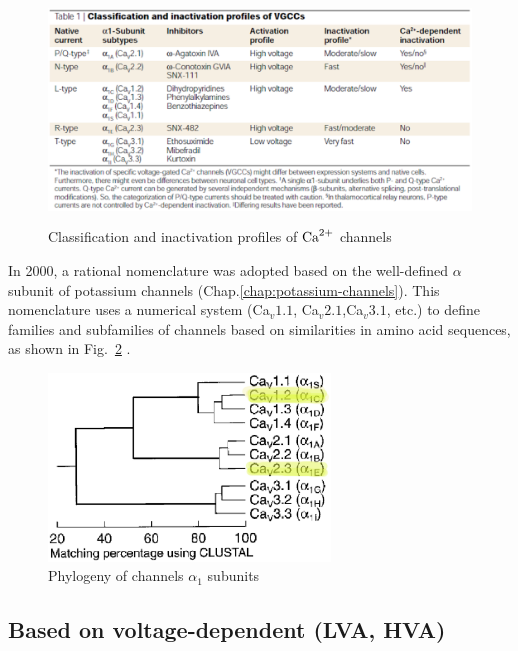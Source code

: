 \begin{figure}[hbt]
  \centerline{\includegraphics[height=6cm,
    angle=0]{./images/Ca_channel_info.eps}}
\caption{Classification and inactivation profiles of ${\text{Ca}^{2+}}$ channels}
\label{fig:Ca_channel_info}
\end{figure}


In 2000, a rational nomenclature was adopted based on the well-defined $\alpha$
subunit of potassium channels \citep{Ertel2000Nomenclature}
(Chap.\ref{chap:potassium-channels}). This nomenclature uses a
numerical system (Ca$_v1.1$, Ca$_v2.1$,Ca$_v3.1$, etc.) to define families and subfamilies of
 channels based on similarities in amino acid sequences,
as shown in Fig.~\ref{fig:ca_channel_phylogeny}
\citep{catterall2005iup}.

\begin{figure}[htb]
  \centerline{\includegraphics[height=5cm]{./images/Ca_channel_nomenclature.eps}}
  \caption{Phylogeny of  channels $\alpha_1$ subunits}
  \label{fig:ca_channel_phylogeny}
\end{figure}

\subsection{Based on voltage-dependent (LVA, HVA)}
\label{sec:LVA_Ca2+}
\label{sec:HVA_Ca2+}

